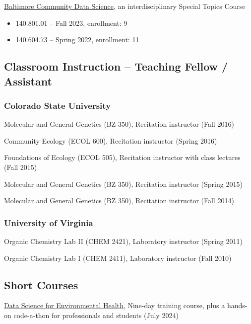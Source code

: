 \documentclass{cv}
\begin{document}
\href{https://jhudatascience.org/Baltimore_Community_Course/index.html}{Baltimore Community Data Science}, an interdisciplinary Special Topics Course

\begin{itemize}

\item 140.801.01 -- Fall 2023, enrollment: 9

\item 140.604.73 -- Spring 2022, enrollment: 11

\end{itemize}

\subsection*{Classroom Instruction -- Teaching Fellow / Assistant}

\subsubsection*{Colorado State University}

Molecular and General Genetics (BZ 350), Recitation instructor (Fall 2016)

Community Ecology (ECOL 600), Recitation instructor (Spring 2016)

Foundations of Ecology (ECOL 505), Recitation instructor with class lectures (Fall 2015)

Molecular and General Genetics (BZ 350), Recitation instructor (Spring 2015)

Molecular and General Genetics (BZ 350), Recitation instructor (Fall 2014)

\subsubsection*{University of Virginia}

Organic Chemistry Lab II (CHEM 2421), Laboratory instructor (Spring 2011)

Organic Chemistry Lab I (CHEM 2411), Laboratory instructor (Fall 2010)

\subsection*{Short Courses}

\href{}{Data Science for Environmental Health}, Nine-day training course, plus a hands-on code-a-thon for professionals and students (July 2024)
\end{document}
